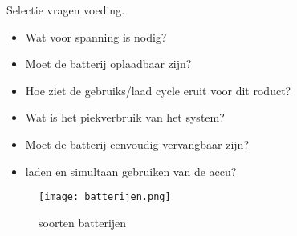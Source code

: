 \vspace{0.5cm}
Selectie vragen voeding.
\begin{itemize}
    \item Wat voor spanning is nodig?
    \item Moet de batterij oplaadbaar zijn?
    \item Hoe ziet de gebruiks/laad cycle eruit voor dit roduct?
    \item Wat is het piekverbruik van het system?
    \item Moet de batterij eenvoudig vervangbaar zijn?
    \item laden en simultaan gebruiken van de accu?
\end{itemize}

\begin{figure}[H]
    \centering
    \texttt{[image: batterijen.png]}
    \caption*{ soorten batterijen}
    \end{figure}
